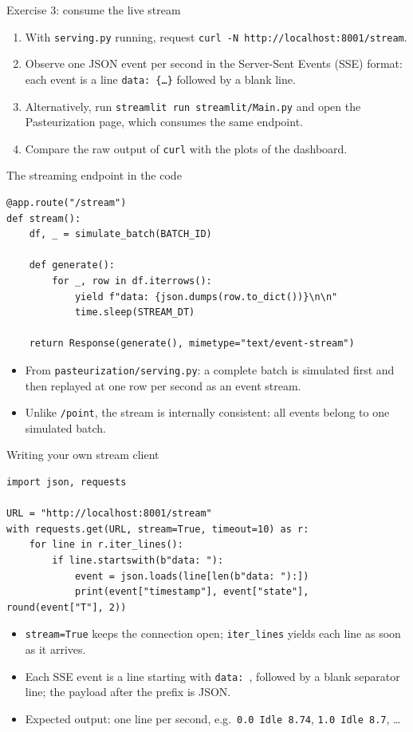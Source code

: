 \begin{frame}{Exercise 3: consume the live stream}
\begin{enumerate}
\item With \texttt{serving.py} running, request \texttt{curl -N http://localhost:8001/stream}.
\item Observe one JSON event per second in the Server-Sent Events (SSE) format: each event is a line \texttt{data: \{\dots\}} followed by a blank line.
\item Alternatively, run \texttt{streamlit run streamlit/Main.py} and open the Pasteurization page, which consumes the same endpoint.
\item Compare the raw output of \texttt{curl} with the plots of the dashboard.
\end{enumerate}
\coursefooter
\end{frame}

\begin{frame}[fragile]{The streaming endpoint in the code}
\begin{lstlisting}[style=coursepython]
@app.route("/stream")
def stream():
    df, _ = simulate_batch(BATCH_ID)

    def generate():
        for _, row in df.iterrows():
            yield f"data: {json.dumps(row.to_dict())}\n\n"
            time.sleep(STREAM_DT)

    return Response(generate(), mimetype="text/event-stream")
\end{lstlisting}
\begin{itemize}
\item From \texttt{pasteurization/serving.py}: a complete batch is simulated first and then replayed at one row per second as an event stream.
\item Unlike \texttt{/point}, the stream is internally consistent: all events belong to one simulated batch.
\end{itemize}
\coursefooter
\end{frame}

\begin{frame}[fragile]{Writing your own stream client}
\begin{lstlisting}[style=coursepython]
import json, requests

URL = "http://localhost:8001/stream"
with requests.get(URL, stream=True, timeout=10) as r:
    for line in r.iter_lines():
        if line.startswith(b"data: "):
            event = json.loads(line[len(b"data: "):])
            print(event["timestamp"], event["state"], round(event["T"], 2))
\end{lstlisting}
\begin{itemize}
\item \texttt{stream=True} keeps the connection open; \texttt{iter\_lines} yields each line as soon as it arrives.
\item Each SSE event is a line starting with \texttt{data: }, followed by a blank separator line; the payload after the prefix is JSON.
\item Expected output: one line per second, e.g.\ \texttt{0.0 Idle 8.74}, \texttt{1.0 Idle 8.7}, \dots
\end{itemize}
\coursefooter
\end{frame}

